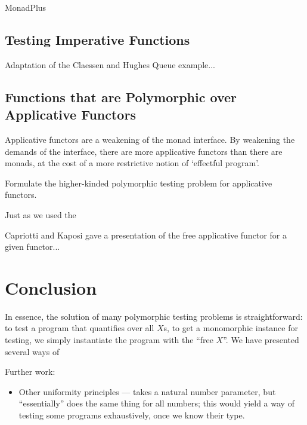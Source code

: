 \documentclass{llncs}
\begin{document}
MonadPlus

\subsection{Testing Imperative Functions}

Adaptation of the Claessen and Hughes Queue example...

\subsection{Functions that are Polymorphic over Applicative Functors}

Applicative functors \cite{mcbride-patterson} are a weakening of the
monad interface. By weakening the demands of the interface, there are
more applicative functors than there are monads, at the cost of a more
restrictive notion of `effectful program'.

Formulate the higher-kinded polymorphic testing problem for
applicative functors.

Just as we used the 

Capriotti and Kaposi gave a presentation of the free applicative
functor for a given functor...

\section{Conclusion}

In essence, the solution of many polymorphic testing problems is
straightforward: to test a program that quantifies over all $X$s, to
get a monomorphic instance for testing, we simply instantiate the
program with the ``free $X$''. We have presented several ways of 

Further work:
\begin{itemize}
\item Other uniformity principles --- takes a natural number
  parameter, but ``essentially'' does the same thing for all numbers;
  this would yield a way of testing some programs exhaustively, once
  we know their type.
\end{itemize}

 
\end{document}

